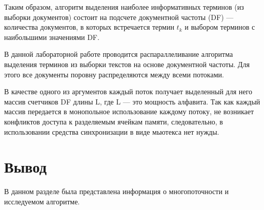 Таким образом, алгоритм выделения наиболее информативных терминов (из выборки документов) состоит на подсчете документной частоты (DF) --- количества документов, в которых встречается термин $t_k$ и выбором терминов с наибольшими значениями DF.

В данной лабораторной работе проводится распараллеливание алгоритма выделения терминов из выборки текстов на основе документной частоты. Для этого все документы поровну распределяются между всеми потоками. 

В качестве одного из аргументов каждый поток получает выделенный для него массив счетчиков DF длины L, где L --- это мощность алфавита. Так как каждый массив передается в монопольное использование каждому потоку, не возникает конфликтов доступа к разделяемым ячейкам памяти, следовательно, в использовании средства синхронизации в виде мьютекса нет нужды.


\section*{Вывод}
В данном разделе была представлена информация о многопоточности и исследуемом алгоритме.